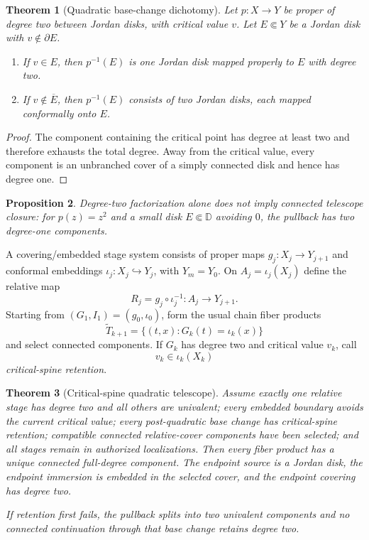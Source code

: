 \documentclass[11pt]{article}
\newtheorem{theorem}{Theorem}[section]
\newtheorem{proposition}[theorem]{Proposition}
\theoremstyle{definition}
\theoremstyle{remark}
\newcommand{\D}{\mathbb D}
\begin{document}
\begin{theorem}[Quadratic base-change dichotomy]\label{thm:basechange}
Let $p:X\to Y$ be proper of degree two between Jordan disks, with critical value $v$.  Let $E\Subset Y$ be a Jordan disk with $v\notin\partial E$.
\begin{enumerate}[label=(\roman*)]
\item If $v\in E$, then $p^{-1}(E)$ is one Jordan disk mapped properly to $E$ with degree two.
\item If $v\notin\overline E$, then $p^{-1}(E)$ consists of two Jordan disks, each mapped conformally onto $E$.
\end{enumerate}
\end{theorem}

\begin{proof}
The component containing the critical point has degree at least two and therefore exhausts the total degree.  Away from the critical value, every component is an unbranched cover of a simply connected disk and hence has degree one.
\end{proof}

\begin{proposition}
Degree-two factorization alone does not imply connected telescope closure: for $p(z)=z^2$ and a small disk $E\Subset\D$ avoiding $0$, the pullback has two degree-one components.
\end{proposition}

A covering/embedded stage system consists of proper maps $g_j:X_j\to Y_{j+1}$ and conformal embeddings $\iota_j:X_j\hookrightarrow Y_j$, with $Y_m=Y_0$.  On $A_j=\iota_j(X_j)$ define the relative map
\[
 R_j=g_j\circ\iota_j^{-1}:A_j\to Y_{j+1}.
\]
Starting from $(G_1,I_1)=(g_0,\iota_0)$, form the usual chain fiber products
\[
 \widetilde T_{k+1}
 =\{(t,x):G_k(t)=\iota_k(x)\}
\]
and select connected components.  If $G_k$ has degree two and critical value $v_k$, call
\[
 v_k\in\iota_k(X_k)
\]
\emph{critical-spine retention}.

\begin{theorem}[Critical-spine quadratic telescope]\label{thm:telescope}
Assume exactly one relative stage has degree two and all others are univalent; every embedded boundary avoids the current critical value; every post-quadratic base change has critical-spine retention; compatible connected relative-cover components have been selected; and all stages remain in authorized localizations.  Then every fiber product has a unique connected full-degree component.  The endpoint source is a Jordan disk, the endpoint immersion is embedded in the selected cover, and the endpoint covering has degree two.

If retention first fails, the pullback splits into two univalent components and no connected continuation through that base change retains degree two.
\end{theorem}
\end{document}
